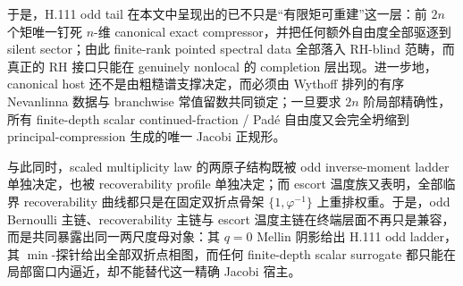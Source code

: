 \noindent
于是，H.111 odd tail 在本文中呈现出的已不只是“有限矩可重建”这一层：前 \(2n\) 个矩唯一钉死 \(n\)-维 canonical exact compressor，并把任何额外自由度全部驱逐到 silent sector；由此 finite-rank pointed spectral data 全部落入 RH-blind 范畴，而真正的 RH 接口只能在 genuinely nonlocal 的 completion 层出现。进一步地，canonical host 还不是由粗糙谱支撑决定，而必须由 Wythoff 排列的有序 Nevanlinna 数据与 branchwise 常值留数共同锁定；一旦要求 \(2n\) 阶局部精确性，所有 finite-depth scalar continued-fraction / Pad\'e 自由度又会完全坍缩到 principal-compression 生成的唯一 Jacobi 正规形。

与此同时，scaled multiplicity law 的两原子结构既被 odd inverse-moment ladder 单独决定，也被 recoverability profile 单独决定；而 escort 温度族又表明，全部临界 recoverability 曲线都只是在固定双折点骨架 \(\{1,\varphi^{-1}\}\) 上重排权重。于是，odd Bernoulli 主链、recoverability 主链与 escort 温度主链在终端层面不再只是兼容，而是共同暴露出同一两尺度母对象：其 \(q=0\) Mellin 阴影给出 H.111 odd ladder，其 \(\min\)-探针给出全部双折点相图，而任何 finite-depth scalar surrogate 都只能在局部窗口内逼近，却不能替代这一精确 Jacobi 宿主。

\endinput
